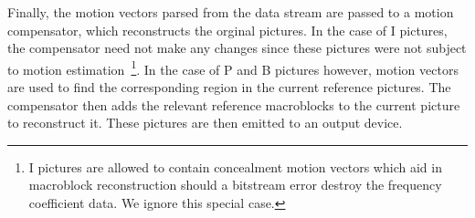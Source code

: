 Finally, the motion vectors parsed from the data stream are passed to
a motion compensator, which reconstructs the orginal pictures. In the
case of I pictures, the compensator need not make any changes since
these pictures were not subject to motion estimation~\footnote{I 
pictures are allowed to contain concealment motion vectors which aid in
macroblock reconstruction should a bitstream error destroy the 
frequency coefficient data. We ignore this special case.}. In the case of P
and B pictures however, motion vectors are used to find the
corresponding region in the current reference pictures. The
compensator then adds the relevant reference macroblocks to the
current picture to reconstruct it. These pictures are then emitted to
an output device.